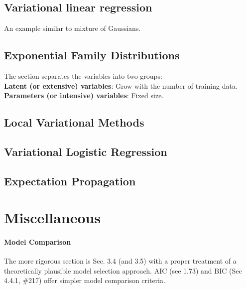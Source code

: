 \documentclass[a4paper]{article}
\begin{document}
\subsection{Variational linear regression}
An example similar to mixture of Gaussians.

\subsection{Exponential Family Distributions}
The section separates the variables into two groups:\\
\textbf{Latent (or extensive) variables}: Grow with the number of training data.\\
\textbf{Parameters (or intensive) variables}: Fixed size.


\subsection{Local Variational Methods}
\subsection{Variational Logistic Regression}
\subsection{Expectation Propagation}
















\clearpage
\newpage



\section*{Miscellaneous}
\paragraph*{Model Comparison} The more rigorous section is Sec. 3.4 (and 3.5) with a proper treatment of a theoretically plausible model selection approach. AIC (see 1.73) and BIC (Sec 4.4.1, \#217) offer simpler model comparison criteria.







\end{document}
